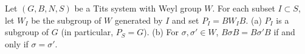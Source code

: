 Let $(G, B, N, S)$ be a Tits system with Weyl group $W$. For each subset $I \subset S$, let $W_I$ be the subgroup of $W$ generated by $I$ and set $P_I = B W_I B$.
(a) $P_I$ is a subgroup of $G$ (in particular, $P_S = G$).
(b) For $\sigma, \sigma' \in W$, $B\sigma B = B\sigma' B$ if and only if $\sigma = \sigma'$.
